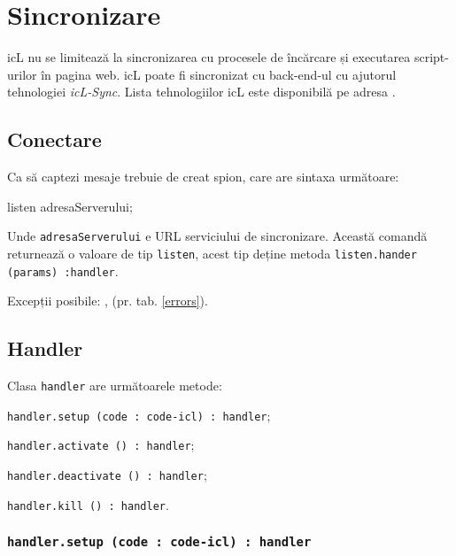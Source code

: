 \section{Sincronizare}
\label{sync}

icL nu se limitează la sincronizarea cu procesele de încărcare și executarea script-urilor în pagina web. icL poate fi sincronizat cu back-end-ul cu ajutorul tehnologiei \textit{icL-Sync}. Lista tehnologiilor icL este disponibilă pe adresa .

\subsection{Conectare}

Ca să captezi mesaje trebuie de creat spion, care are sintaxa următoare:
\begin{iclcode}
listen adresaServerului;
\end{iclcode}

Unde \texttt{adresaServerului} e URL serviciului de sincronizare. Această comandă returnează o valoare de tip \texttt{listen}, acest tip deține metoda \texttt{listen.hander (params) :handler}.

Excepții posibile: ,  (pr. tab. \ref{errors}).

\subsection{Handler}

Clasa \texttt{handler} are următoarele metode:
\begin{icItems}
\item \texttt{handler.setup (code : code-icl) : handler};
\item \texttt{handler.activate () : handler};
\item \texttt{handler.deactivate () : handler};
\item \texttt{handler.kill () : handler}.
\end{icItems}

\subsubsection{\texttt{handler.setup (code : code-icl) : handler}}

